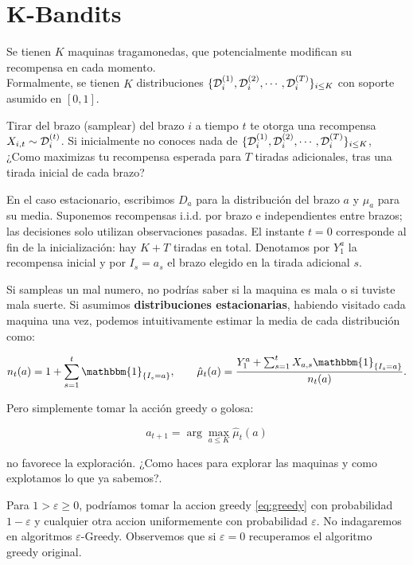 \section{K-Bandits}

Se tienen \(K\) maquinas tragamonedas, que potencialmente modifican su recompensa en cada momento.\\
Formalmente, se tienen \(K\) distribuciones \(\{\mathcal{D}_i^{(1)}, \mathcal{D}_i^{(2)}, \cdots , \mathcal{D}_i^{(T)}\}_{i \leq K}\) con soporte asumido en \([0,1]\).

Tirar del brazo (samplear) del brazo \(i\) a tiempo \(t\) te otorga una recompensa \(X_{i,t} \sim \mathcal{D}_i^{(t)}\).
Si inicialmente no conoces nada de \(\{\mathcal{D}_i^{(1)}, \mathcal{D}_i^{(2)},\cdots, \mathcal{D}_i^{(T)}\}_{i \leq K}\), ¿Como maximizas tu recompensa esperada para \(T\) tiradas adicionales, tras una tirada inicial de cada brazo?

En el caso estacionario, escribimos \(D_a\) para la distribución del brazo \(a\) y \(\mu_a\) para su media. Suponemos recompensas i.i.d. por brazo e independientes entre brazos; las decisiones solo utilizan observaciones pasadas. El instante \(t=0\) corresponde al fin de la inicialización: hay \(K+T\) tiradas en total. Denotamos por \(Y_1^a\) la recompensa inicial y por \(I_s=a_s\) el brazo elegido en la tirada adicional \(s\).

Si sampleas un mal numero, no podrías saber si la maquina es mala o si tuviste mala suerte.
Si asumimos \textbf{distribuciones estacionarias}, habiendo visitado cada maquina una vez, podemos intuitivamente estimar la media de cada distribución como:

\begin{equation}
    n_t(a)=1+\sum_{s=1}^t\mathbbm{1}_{\{I_s=a\}},\qquad
    \hat{\mu}_t(a) = \dfrac{Y_1^a+\sum^t_{s=1} X_{a,s} \mathbbm{1}_{\{I_s = a\}}}{n_t(a)}.
\end{equation}

Pero simplemente tomar la acción greedy o golosa:

\begin{equation}\label{eq:greedy}
    a_{t+1} = \arg\max_{a \leq K} \hat{\mu}_t(a)
\end{equation}

no favorece la exploración. ¿Como haces para explorar las maquinas y como explotamos lo que ya sabemos?.

\begin{observation} \label{obs:epsgreedy}
Para \(1 > \varepsilon \geq 0\), podríamos tomar la accion greedy \eqref{eq:greedy} con probabilidad \(1-\varepsilon\) y cualquier otra accion uniformemente con probabilidad \(\varepsilon\). No indagaremos en algoritmos \(\varepsilon\)-Greedy. Observemos que si \(\varepsilon=0\) recuperamos el algoritmo greedy original.
\end{observation}

